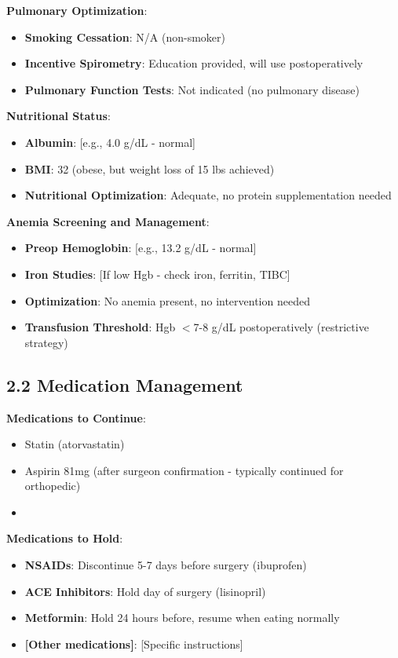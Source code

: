 \documentclass[11pt,letterpaper]{article}
\begin{document}
\textbf{Pulmonary Optimization}:
\begin{itemize}[leftmargin=*]
    \item \textbf{Smoking Cessation}: N/A (non-smoker)
    \item \textbf{Incentive Spirometry}: Education provided, will use postoperatively
    \item \textbf{Pulmonary Function Tests}: Not indicated (no pulmonary disease)
\end{itemize}

\textbf{Nutritional Status}:
\begin{itemize}[leftmargin=*]
    \item \textbf{Albumin}: [e.g., 4.0 g/dL - normal]
    \item \textbf{BMI}: 32 (obese, but weight loss of 15 lbs achieved)
    \item \textbf{Nutritional Optimization}: Adequate, no protein supplementation needed
\end{itemize}

\textbf{Anemia Screening and Management}:
\begin{itemize}[leftmargin=*]
    \item \textbf{Preop Hemoglobin}: [e.g., 13.2 g/dL - normal]
    \item \textbf{Iron Studies}: [If low Hgb - check iron, ferritin, TIBC]
    \item \textbf{Optimization}: No anemia present, no intervention needed
    \item \textbf{Transfusion Threshold}: Hgb $<$7-8 g/dL postoperatively (restrictive strategy)
\end{itemize}

\subsection*{2.2 Medication Management}

\textbf{Medications to Continue}:
\begin{itemize}[leftmargin=*]
    \item Statin (atorvastatin)
    \item Aspirin 81mg (after surgeon confirmation - typically continued for orthopedic)
    \item [Other chronic medications per anesthesia recommendations]
\end{itemize}

\textbf{Medications to Hold}:
\begin{itemize}[leftmargin=*]
    \item \textbf{NSAIDs}: Discontinue 5-7 days before surgery (ibuprofen)
    \item \textbf{ACE Inhibitors}: Hold day of surgery (lisinopril)
    \item \textbf{Metformin}: Hold 24 hours before, resume when eating normally
    \item \textbf{[Other medications]}: [Specific instructions]
\end{itemize}
\end{document}
